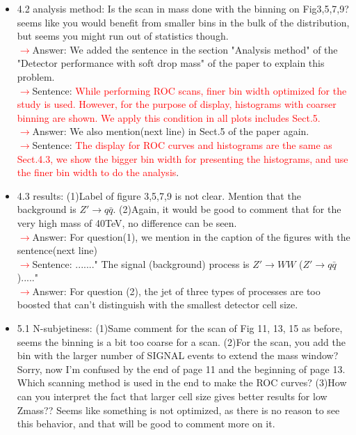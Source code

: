 \documentclass[final,1p,11pt]{elsarticle}
\begin{document}
\begin{itemize}
\item 4.2 analysis method: Is the scan in mass done with the binning on Fig3,5,7,9? seems like you would benefit from smaller bins in the bulk of the distribution, but seems you might run out of statistics though.\\
 \textcolor{red}{$\rightarrow$}Answer: We added the sentence in the section "Analysis method" of the "Detector performance with soft drop mass" of the paper to explain this problem.\\
 \textcolor{red}{$\rightarrow$}Sentence: \textcolor{red}{While performing ROC scans, finer bin width optimized for the study is used. However, for the purpose of display, histograms with coarser binning are shown. We apply this condition in all plots includes Sect.5.}\\
 \textcolor{red}{$\rightarrow$}Answer: We also mention(next line) in Sect.5 of the paper again.\\
 \textcolor{red}{$\rightarrow$}Sentence: \textcolor{red}{The display for ROC curves and histograms are the same as Sect.4.3, we show the bigger bin width for presenting the histograms, and use the finer bin width to do the analysis}.
\item 4.3 results: (1)Label of figure 3,5,7,9 is not clear. Mention that the background is $Z'\rightarrow q\bar{q}$. (2)Again, it would be good to comment that for the very high mass of 40TeV, no difference can be seen.\\
 \textcolor{red}{$\rightarrow$}Answer:  For question(1), we mention in the caption of the figures with the sentence(next line)\\
 \textcolor{red}{$\rightarrow$}Sentence:  ......." The signal (background) process is $Z' \rightarrow WW$ ($Z'\rightarrow q\bar{q}$)....."\\
 \textcolor{red}{$\rightarrow$}Answer:  For question (2), the jet of three types of processes are too boosted that can't distinguish with the smallest detector cell size.\\
\item 5.1 N-subjetiness: (1)Same comment for the scan of Fig 11, 13, 15 as before, seems the binning is a bit too coarse for a scan. (2)For the scan, you add the bin with the larger number of SIGNAL events to extend the mass window? Sorry, now I'm confused by the end of page 11 and the beginning of page 13. Which scanning method is used in the end to make the ROC curves? (3)How can you interpret the fact that larger cell size gives better results for low Zmass?? Seems like something is not optimized, as there is no reason to see this behavior, and that will be good to comment more on it.\\

\end{itemize}
\end{document}
